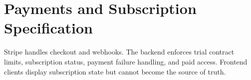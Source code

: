 \chapter{Payments and Subscription Specification}
Stripe handles checkout and webhooks. The backend enforces trial contract limits, subscription status, payment failure handling, and paid access. Frontend clients display subscription state but cannot become the source of truth.
